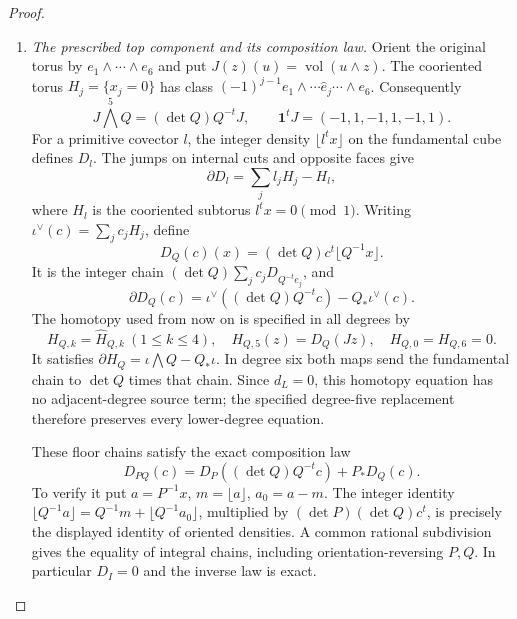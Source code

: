 \begin{proof}
\begin{enumerate}[label=\arabic*.]
For $v=\sum_jv_je_j$, put $s_j=\sum_{r\leq j}v_re_r$, $s_0=0$,
and define the projected oriented triangle chain
\[
 A_v=\sum_{j=1}^6[0,s_{j-1},s_j],\qquad
 \partial A_v=\sum_jv_j\gamma_j-\ell_v.
\]
Indeed the diagonal edges cancel, and the edge from $s_{j-1}$ to
$s_j$ is the translated coordinate loop with signed winding $v_j$.
For the columns $q_j=Qe_j$ of either actual unimodular marking matrix,
set
\[
\begin{split}
\widehat H_{Q,k}(e_{i_1}\wedge\cdots\wedge e_{i_k})
=\sum_{r=1}^k(-1)^{r-1}
 &\iota(q_{i_1})*\cdots*\iota(q_{i_{r-1}})*A_{q_{i_r}}\\
 &*\ell_{q_{i_{r+1}}}*\cdots*\ell_{q_{i_k}}.
\end{split}
\]
The Leibniz sign cancels the displayed sign. The sum telescopes to
the exact identity
\[
 \partial\widehat H_Q=\iota\bigwedge Q-Q_*\iota.
\]
Thus every lower-degree homotopy below is a specified finite sum
of integer triangles and products.

\item \emph{The prescribed top component and its composition law.}
Orient the original torus by $e_1\wedge\cdots\wedge e_6$ and put
$J(z)(u)=\operatorname{vol}(u\wedge z)$. The cooriented torus
$H_j=\{x_j=0\}$ has class
$(-1)^{j-1}e_1\wedge\cdots\widehat e_j\cdots\wedge e_6$.
Consequently
\[
 J\bigwedge^5Q=(\det Q)Q^{-t}J,\qquad
 \mathbf1^tJ=(-1,1,-1,1,-1,1).
\]
For a primitive covector $l$, the integer density
$\lfloor l^tx\rfloor$ on the fundamental cube defines $D_l$.
The jumps on internal cuts and opposite faces give
\[
 \partial D_l=\sum_jl_jH_j-H_l,
\]
where $H_l$ is the cooriented subtorus $l^tx=0\pmod1$.
Writing $\iota^\vee(c)=\sum_jc_jH_j$, define
\[
 D_Q(c)(x)=(\det Q)c^t\lfloor Q^{-1}x\rfloor.
\]
It is the integer chain $(\det Q)\sum_jc_jD_{Q^{-t}e_j}$, and
\[
 \partial D_Q(c)=\iota^\vee((\det Q)Q^{-t}c)
                         -Q_*\iota^\vee(c).
\]
The homotopy used from now on is specified in all degrees by
\[
 H_{Q,k}=\widehat H_{Q,k}\ (1\leq k\leq4),\quad
 H_{Q,5}(z)=D_Q(Jz),\quad H_{Q,0}=H_{Q,6}=0.
\]
It satisfies $\partial H_Q=\iota\bigwedge Q-Q_*\iota$.
In degree six both maps send the fundamental chain to $\det Q$
times that chain. Since $d_L=0$, this homotopy equation has no
adjacent-degree source term; the specified degree-five replacement
therefore preserves every lower-degree equation.

These floor chains satisfy the exact composition law
\[
 D_{PQ}(c)=D_P((\det Q)Q^{-t}c)+P_*D_Q(c).
\]
To verify it put $a=P^{-1}x$, $m=\lfloor a\rfloor$, $a_0=a-m$.
The integer identity
$\lfloor Q^{-1}a\rfloor=Q^{-1}m+\lfloor Q^{-1}a_0\rfloor$,
multiplied by $(\det P)(\det Q)c^t$, is precisely the displayed
identity of oriented densities. A common rational subdivision gives
the equality of integral chains, including orientation-reversing
$P,Q$. In particular $D_I=0$ and the inverse law is exact.


\end{enumerate}
\end{proof}

